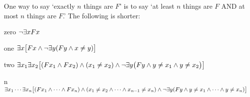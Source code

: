 \documentclass[PHIL101-Textbook.tex]{subfiles}
\begin{document}
One way to say `exactly $n$ things are $F$' is to say `at least $n$ things are $F$ AND at most $n$ things are $F$.' The following is shorter:
\begin{ekey}
\item[zero] $\neg \exists x Fx$
\item[one] $\exists x\bigl[Fx \land \neg\exists y(Fy \land x\neq y)\bigr]$
\item[two] $\exists x_1\exists x_2\bigl[(Fx_1 \land Fx_2) \land (x_1 \neq x_2) \land \neg\exists y\bigl(Fy \land y\neq x_1 \land y \neq x_2\bigr) \bigr]$
\item[n] $\exists x_1\cdots\exists x_n\bigl[(Fx_1 \land\cdots\land Fx_n)  \land (x_1 \neq x_2 \land\cdots\land x_{n-1}\neq x_n) \land\\
 \neg\exists y(Fy \land y\neq x_1 \land \cdots \land y\neq x_n)\bigr]$ 
\end{ekey}


\newpage



\end{document}
